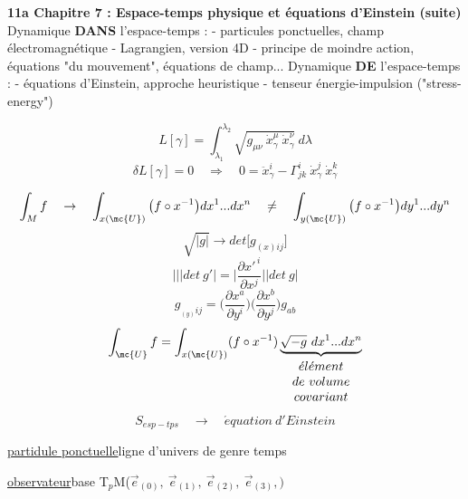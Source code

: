 
{\bf 11a Chapitre 7 : Espace-temps physique et équations d'Einstein (suite)}
Dynamique {\bf DANS} l'espace-temps :
- particules ponctuelles, champ électromagnétique
- Lagrangien, version 4D
- principe de moindre action, équations "du mouvement", équations de champ...
Dynamique {\bf DE} l'espace-temps :
- équations d'Einstein, approche heuristique
- tenseur énergie-impulsion ("stress-energy")

\[
L[\gamma]=\int^{\lambda_2}_{\lambda_1}\sqrt{g_{\mu\nu}
\ \dot x^\mu_\gamma\ \dot x^\nu_\gamma}\ d\lambda 
\]
\[
\delta L[\gamma]=0\quad\Rightarrow\quad 0=\ddot x^i_\gamma-\Gamma^i_{jk}
\ \dot x^j_\gamma\ \dot x^k_\gamma
\]
\begin{minipage}[c]{.45\linewidth}
\end{minipage}
\hfill
\begin{minipage}[c]{.45\linewidth}
\end{minipage}
\[
\int_Mf\quad\to\quad\int_{x(\mc{U})}\big(f\circ x^{-1}\big)dx^1...dx^n\quad\neq
\quad\int_{y(\mc{U})}\big(f\circ x^{-1}\big)dy^1...dy^n
\]
\[
\sqrt{|g|}\to det\big[g_{(x) ij}\big]
\]
\[{\big|\big|}
\big|det\ g'\big|=\big|\frac{\partial x'^{\,i}}{\partial x^j}\big|
\big|det\ g\big|
\]
\[
g_{_{(y)}ij}=\big(\frac{\partial x^a}{\partial y^i}\big)
\big(\frac{\partial x^b}{\partial y^j}\big)g_{ab}
\]
\renewcommand{\arraystretch}{0.7}
\[
\int_\mc{U}f=\int_{x(\mc{U})}(f\circ x^{-1})\underbrace{\sqrt{-g}\ dx^1...dx^n}_{
\begin{array}{ c }
\acute el\acute ement \\ de\ volume \\ covariant
\end{array}}
\]
\[{}
S_{esp-tps}\quad\to\quad\acute equation\ d'Einstein
\]

\underline{partidule ponctuelle}\quad ligne d'univers de genre temps

\underline{observateur}\quad base T$_p$M($\vec e_{(0)},\ \vec e_{(1)},\ \vec e_{(2)},\ \vec e_{(3)},) $
\[{}
\]
\[{}
\]
\[{}
\]
